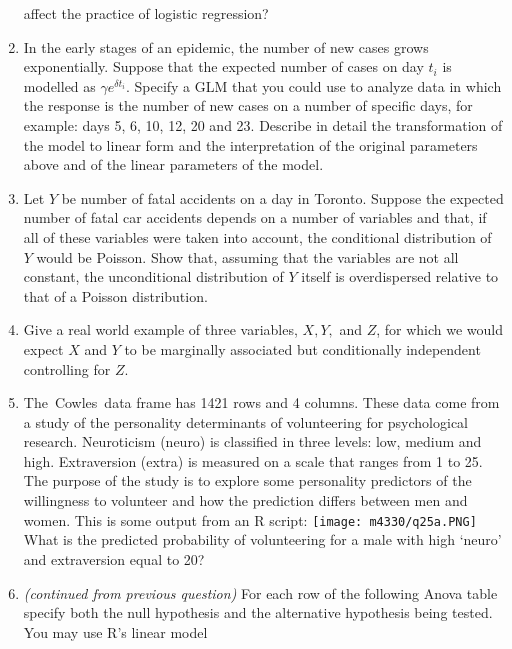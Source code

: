 \documentclass[
]{article}
\begin{document}
\begin{enumerate}
  affect the practice of logistic regression? \vspace{0px}
\item
  In the early stages of an epidemic, the number of new cases grows
  exponentially. Suppose that the expected number of cases on day
  \(t_i\) is modelled as \(\gamma e^{\delta t_i}\). Specify a GLM that
  you could use to analyze data in which the response is the number of
  new cases on a number of specific days, for example: days 5, 6, 10,
  12, 20 and 23. Describe in detail the transformation of the model to
  linear form and the interpretation of the original parameters above
  and of the linear parameters of the model. \vspace{0px}
\item
  Let \(Y\) be number of fatal accidents on a day in Toronto. Suppose
  the expected number of fatal car accidents depends on a number of
  variables and that, if all of these variables were taken into account,
  the conditional distribution of \(Y\) would be Poisson. Show that,
  assuming that the variables are not all constant, the unconditional
  distribution of \(Y\) itself is overdispersed relative to that of a
  Poisson distribution. \vspace{0px}
\item
  Give a real world example of three variables, \(X, Y,\) and \(Z\), for
  which we would expect \(X\) and \(Y\) to be marginally associated but
  conditionally independent controlling for \(Z\). \vspace{0px}
\item
  The~Cowles~data frame has 1421 rows and 4 columns. These data come
  from a study of the personality determinants of volunteering for
  psychological research. Neuroticism (neuro) is classified in three
  levels: low, medium and high. Extraversion (extra) is measured on a
  scale that ranges from 1 to 25. The purpose of the study is to explore
  some personality predictors of the willingness to volunteer and how
  the prediction differs between men and women. This is some output from
  an R script: \newline \texttt{[image: m4330/q25a.PNG]} \newline What
  is the predicted probability of volunteering for a male with high
  `neuro' and extraversion equal to 20? \vspace{0px}
\item
  \emph{(continued from previous question)} For each row of the
  following Anova table specify both the null hypothesis and the
  alternative hypothesis being tested. You may use R's linear model

\end{enumerate}
\end{document}
